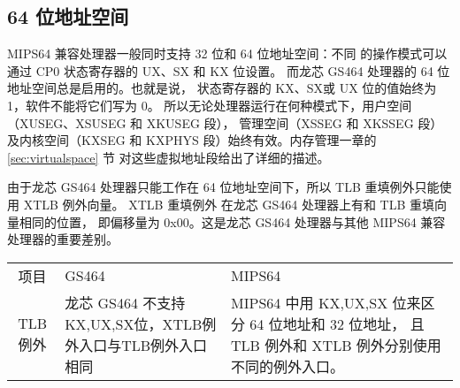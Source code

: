 
\subsection{64 位地址空间}

MIPS64 兼容处理器一般同时支持 32 位和 64 位地址空间：不同
的操作模式可以通过 CP0 状态寄存器的 UX、SX 和 KX
位设置。 而龙芯 GS464 处理器的 64 位地址空间总是启用的。也就是说，
状态寄存器的 KX、SX或 UX 位的值始终为 1，软件不能将它们写为 0。
所以无论处理器运行在何种模式下，用户空间（XUSEG、XSUSEG 和 XKUSEG 段），
管理空间（XSSEG 和 XKSSEG 段）及内核空间（KXSEG 和
KXPHYS 段）始终有效。内存管理一章的 \ref{sec:virtualspace} 节
对这些虚拟地址段给出了详细的描述。

由于龙芯 GS464 处理器只能工作在 64 位地址空间下，所以 TLB 重填例外只能使用 XTLB
例外向量。 XTLB 重填例外 在龙芯 GS464 处理器上有和 TLB 重填向量相同的位置，
即偏移量为 0x00。这是龙芯 GS464 处理器与其他 MIPS64 兼容处理器的重要差别。

\begin{tabular}{|c|p{6.5cm}|p{6cm}|} \hline
  项目 & GS464 & MIPS64 \\ \hhline
  TLB 例外 &
  龙芯 GS464 不支持KX,UX,SX位，XTLB例外入口与TLB例外入口相同 &
  MIPS64 中用 KX,UX,SX 位来区分 64 位地址和 32 位地址， 且 TLB 例外和 XTLB
  例外分别使用不同的例外入口。 \\ \hline 
\end{tabular}

